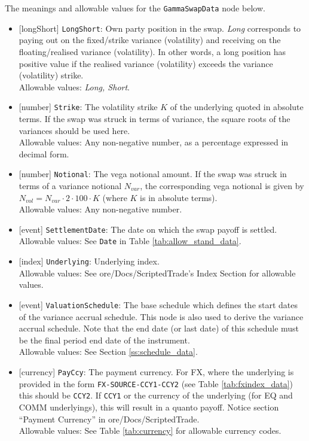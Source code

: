 The meanings and allowable values for the \lstinline!GammaSwapData! node below.

\begin{itemize}
  \item{}[longShort] \lstinline!LongShort!: Own party position in the swap. \emph{Long} corresponds to paying out on the
  fixed/strike variance (volatility) and receiving on the floating/realised variance (volatility). In other words,
  a long position has positive value if the realised variance (volatility) exceeds the variance (volatility)
  strike. \\
  Allowable values: \emph{Long, Short}.
  \item{}[number] \lstinline!Strike!: The volatility strike $K$ of the underlying quoted in absolute terms.
  If the swap was struck in terms of variance, the square roots of the variances should be used here. \\
  Allowable values: Any non-negative number, as a percentage expressed in decimal form.
  \item{}[number] \lstinline!Notional!: The vega notional amount. If the swap was struck in terms of a variance notional
  $N_{var}$, the corresponding vega notional is given by $N_{vol} = N_{var} \cdot 2 \cdot 100 \cdot K$
  (where $K$ is in absolute terms). \\
  Allowable values: Any non-negative number.
  \item{}[event] \lstinline!SettlementDate!: The date on which the swap payoff is settled. \\
  Allowable values: See \lstinline!Date! in Table \ref{tab:allow_stand_data}.
  \item{}[index] \lstinline!Underlying!: Underlying index. \\
  Allowable values: See ore/Docs/ScriptedTrade's Index Section for allowable values.
  \item{}[event] \lstinline!ValuationSchedule!: The base schedule which defines the start dates of the variance accrual schedule. This node is
  also used to derive the variance accrual schedule. Note that the end date (or last date) of this schedule must be the final
  period end date of the instrument. \\
  Allowable values: See Section \ref{ss:schedule_data}.
  \item{}[currency] \lstinline!PayCcy!: The payment currency. For FX, where the underlying is provided
      in the form \lstinline!FX-SOURCE-CCY1-CCY2! (see Table \ref{tab:fxindex_data}) this should
      be \lstinline!CCY2!. If \lstinline!CCY1! or the currency of the underlying (for EQ and
      COMM underlyings), this will result in a quanto payoff. Notice section ``Payment Currency'' in ore/Docs/ScriptedTrade. \\
        Allowable values: See Table \ref{tab:currency} for allowable currency codes.
\end{itemize}

